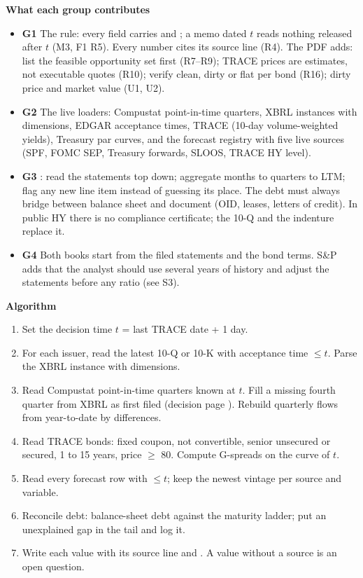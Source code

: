 \documentclass[11pt]{article}
\newcommand{\GA}{\textcolor{gA}{\textbf{G1}}}
\newcommand{\GB}{\textcolor{gB}{\textbf{G2}}}
\newcommand{\GC}{\textcolor{gC}{\textbf{G3}}}
\newcommand{\GD}{\textcolor{gD}{\textbf{G4}}}
\newcommand{\fld}[1]{\par\medskip\noindent\textbf{\textcolor{steel}{#1}}\par\nopagebreak}
\begin{document}
\fld{What each group contributes}
\begin{itemize}
\item \GA{} The rule: every field carries  and ; a memo dated $t$ reads nothing released after $t$ (M3, F1 R5). Every number cites its source line (R4). The PDF adds: list the feasible opportunity set first (R7--R9); TRACE prices are estimates, not executable quotes (R10); verify clean, dirty or flat per bond (R16); dirty price and market value (U1, U2).
\item \GB{} The live loaders: Compustat point-in-time quarters, XBRL instances with dimensions, EDGAR acceptance times, TRACE (10-day volume-weighted yields), Treasury par curves, and the forecast registry with five live sources (SPF, FOMC SEP, Treasury forwards, SLOOS, TRACE HY level).
\item \GC{} : read the statements top down; aggregate months to quarters to LTM; flag any new line item instead of guessing its place. The debt must always bridge between balance sheet and document (OID, leases, letters of credit). In public HY there is no compliance certificate; the 10-Q and the indenture replace it.
\item \GD{} Both books start from the filed statements and the bond terms. S\&P adds that the analyst should use several years of history and adjust the statements before any ratio (see S3).
\end{itemize}

\fld{Algorithm}
\begin{algobox}
\begin{enumerate}
\item Set the decision time $t$ = last TRACE date + 1 day.
\item For each issuer, read the latest 10-Q or 10-K with acceptance time $\le t$. Parse the XBRL instance with dimensions.
\item Read Compustat point-in-time quarters known at $t$. Fill a missing fourth quarter from XBRL as first filed (decision page ). Rebuild quarterly flows from year-to-date by differences.
\item Read TRACE bonds: fixed coupon, not convertible, senior unsecured or secured, 1 to 15 years, price $\ge$ 80. Compute G-spreads on the curve of $t$.
\item Read every forecast row with  $\le t$; keep the newest vintage per source and variable.
\item Reconcile debt: balance-sheet debt against the maturity ladder; put an unexplained gap in the tail and log it.
\item Write each value with its source line and . A value without a source is an open question.
\end{enumerate}
\end{algobox}
\end{document}
